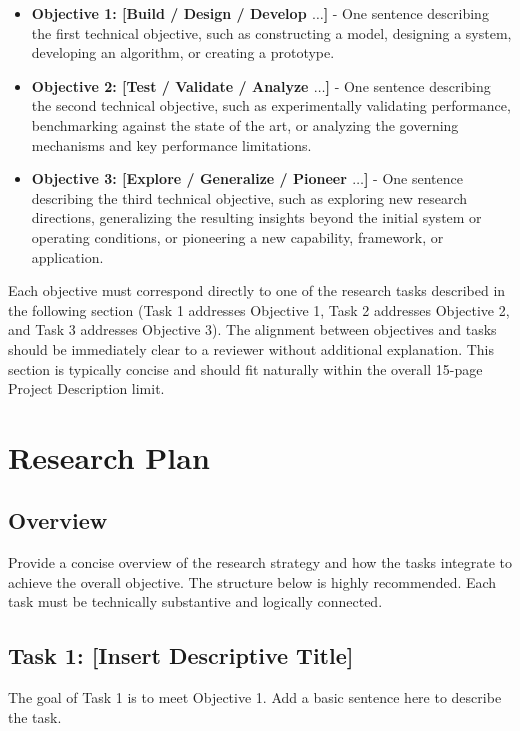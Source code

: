\documentclass[11pt,letterpaper]{article}
\begin{document}
{\begin{itemize}
    \item \textbf{Objective 1: [Build / Design / Develop $\dots$]} - One sentence describing the first technical objective, such as constructing a model, designing a system, developing an algorithm, or creating a prototype.
    \item \textbf{Objective 2: [Test / Validate / Analyze $\dots$]} - One sentence describing the second technical objective, such as experimentally validating performance, benchmarking against the state of the art, or analyzing the governing mechanisms and key performance limitations.
    \item \textbf{Objective 3: [Explore / Generalize / Pioneer $\dots$]} - One sentence describing the third technical objective, such as exploring new research directions, generalizing the resulting insights beyond the initial system or operating conditions, or pioneering a new capability, framework, or application.
\end{itemize}

Each objective must correspond directly to one of the research tasks described in the following section (Task 1 addresses Objective 1, Task 2 addresses Objective 2, and Task 3 addresses Objective 3).
The alignment between objectives and tasks should be immediately clear to a reviewer without additional explanation.
This section is typically concise and should fit naturally within the overall 15-page Project Description limit.


\section{Research Plan}

\subsection{Overview}

Provide a concise overview of the research strategy and how the tasks integrate to achieve the overall objective.
The structure below is highly recommended. Each task must be technically substantive and logically connected.

\subsection{Task 1: [Insert Descriptive Title]}
The goal of Task 1 is to meet Objective 1. Add a basic sentence here to describe the task.
}
\end{document}
